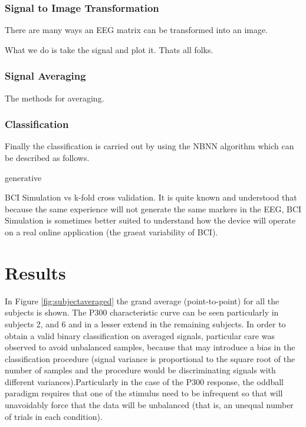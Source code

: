 \documentclass[entropy,article,submit,moreauthors,pdftex,10pt,a4paper]{mdpi}
\begin{document}
\subsubsection{Signal to Image Transformation}

There are many ways an EEG matrix can be transformed into an image.

What we do is take the signal and plot it.  Thats all folks.

\subsubsection{Signal Averaging}

The methods for averaging.  \citep{Liang2008}

\subsubsection{Classification}

Finally the classification is carried out by using the NBNN algorithm which can be described as follows.

generative

BCI Simulation vs k-fold cross validation.  It is quite known and understood that because the same experience will not generate the same markers in the EEG, BCI Simulation is sometimes better suited to understand how the device will operate on a real online application (the graeat variability of BCI).

\section{Results}

In Figure \ref{fig:subjectaveraged} the grand average (point-to-point) for all the subjects is shown.  The P300 characteristic curve can be seen particularly in subjects 2, and 6 and in a lesser extend in the remaining subjects. In order to obtain a valid binary classification on averaged signals, particular care was observed to avoid unbalanced samples, because that may introduce a bias in the classification procedure (signal variance is proportional to the square root of the number of samples and the procedure would be discriminating signals with different variances).Particularly in the case of the P300 response, the oddball paradigm requires that one of the stimulus need to be infrequent so that will unavoidably force that the data will be unbalanced (that is, an unequal number of trials in each condition).
\end{document}
